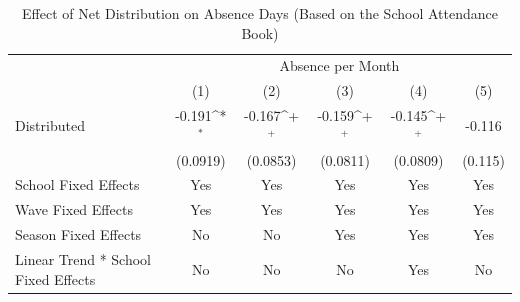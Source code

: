 \documentclass[fleqn,11pt]{article}
\newcommand{\sym}[1]{\rlap{$#1$}}
\def\sym#1{\ifmmode^{#1}\else\(^{#1}\)\fi
}
\begin{document}
% 
\begin{table}[h]
\caption{Effect of Net Distribution on Absence Days (Based on the School Attendance
Book)}
\label{t:olsabsence_dailyattend_monthly_withtrend_child}\centering
\begin{adjustbox}{max width=\textwidth}
\begin{threeparttable}
\begin{tabular}{l*{5}{c}}
\hline\hline
&\multicolumn{5}{c}{Absence per Month}\\ \cmidrule(lr){2-6}
                    &\multicolumn{1}{c}{(1)}&\multicolumn{1}{c}{(2)}&\multicolumn{1}{c}{(3)}&\multicolumn{1}{c}{(4)}&\multicolumn{1}{c}{(5)}\\\hline
Distributed           &      -0.191\sym{*}  &      -0.167\sym{+}  &      -0.159\sym{+}  &      -0.145\sym{+}  &      -0.116         \\
                    &    (0.0919)         &    (0.0853)         &    (0.0811)         &    (0.0809)         &     (0.115)         \\

School Fixed Effects           &         Yes         &         Yes         &         Yes         &         Yes         &         Yes         \\

Wave Fixed Effects            &         Yes         &         Yes         &         Yes         &         Yes         &         Yes         \\

Season Fixed Effects            &          No         &          No         &         Yes         &         Yes         &          Yes         \\

Linear Trend * School Fixed Effects &          No         &          No         &          No         &         Yes         &          No         \\


\end{tabular}
\end{threeparttable}
\end{adjustbox}
\end{table}
\end{document}
